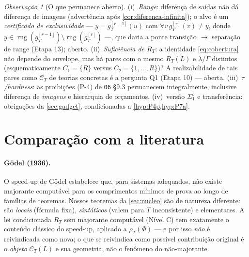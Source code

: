 \documentclass[11pt,a4paper]{article}
\theoremstyle{definition}
\theoremstyle{remark}
\newtheorem*{remark}{Observação}
\begin{document}
\begin{remark}[O que permanece aberto]\label{rem:abertas-global}
(i)~\emph{Range}: diferença de saídas não dá diferença de imagens
(advertência após \cref{cor:diferenca-infinita}); o alvo é um
\emph{certificado de exclusividade} --- $y = g_T^{[r-1]}(u)$ com
$\forall v\, g_T^{[r]}(v) \neq y$, donde $y \in
\operatorname{rng}(g_T^{[r-1]}) \setminus \operatorname{rng}(g_T^{[r]})$
---, que daria a ponte transição $\to$ separação de range (Etapa 13);
aberto. (ii)~\emph{Suficiência de $R_T$}: a identidade
\eqref{eq:cobertura} não depende do envelope, mas há pares com o mesmo
$R_T(L)$ e $\lambda/\Gamma$ distintos (esquematicamente
$C_1 = \{R\}$ versus $C_2 = \{1,\dots,R\}$)? A realizabilidade de
tais pares como $\mathcal{C}_T$ de teorias concretas é a pergunta Q1
(Etapa 10) --- aberta. (iii)~\emph{$\tau$/hardness}: as proibições
(P-4) de \texttt{06} §9.3 permanecem integralmente, inclusive
diferença de \emph{imagens} e hierarquia de orçamentos. (iv)~versão
$\Sigma^b_1$ e transferência: obrigações da \cref{sec:gadget},
condicionadas a \cref{hyp:P4p,hyp:P7a}.
\end{remark}

\section{Compara\c{c}\~{a}o com a literatura}\label{sec:comparacao}

\paragraph{Gödel (1936).}
O speed-up de Gödel \cite{Godel1936} estabelece que, para sistemas adequados,
não existe majorante computável para os comprimentos mínimos de prova ao longo
de famílias de teoremas. Nossos teoremas da \cref{sec:nucleo} são de natureza
diferente: são \emph{locais} (fórmula fixa), \emph{sintáticos} (valem para $T$
inconsistente) e elementares. A lei condicionada $R_T$ sem majorante computável
(Nível C) tem exatamente o conteúdo clássico do speed-up, aplicado a
$\rho_T(\Phi)$ — e por isso \emph{não} é reivindicada como nova; o que se
reivindica como possível contribuição original é o \emph{objeto}
$\mathcal{C}_T(L)$ e sua geometria, não o fenômeno do não-majorante.
\end{document}
